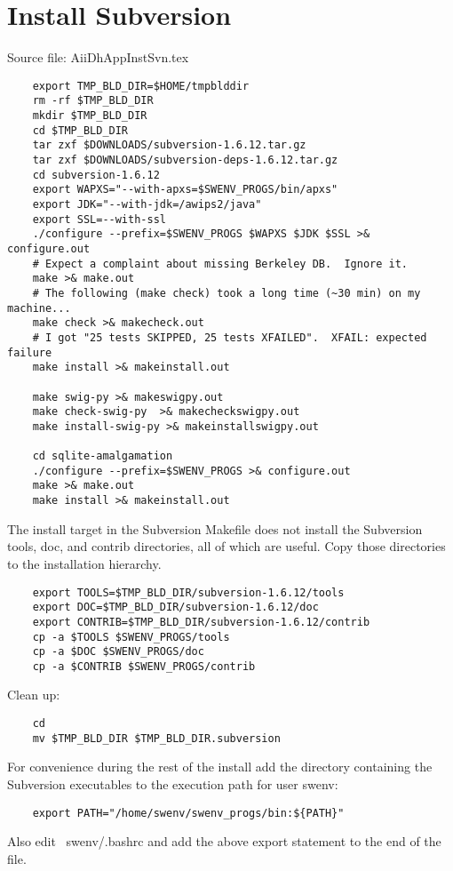 
\section{Install Subversion}

Source file: AiiDhAppInstSvn.tex

\begin{verbatim}
    export TMP_BLD_DIR=$HOME/tmpblddir
    rm -rf $TMP_BLD_DIR
    mkdir $TMP_BLD_DIR
    cd $TMP_BLD_DIR
    tar zxf $DOWNLOADS/subversion-1.6.12.tar.gz
    tar zxf $DOWNLOADS/subversion-deps-1.6.12.tar.gz
    cd subversion-1.6.12
    export WAPXS="--with-apxs=$SWENV_PROGS/bin/apxs"
    export JDK="--with-jdk=/awips2/java"
    export SSL=--with-ssl
    ./configure --prefix=$SWENV_PROGS $WAPXS $JDK $SSL >& configure.out
    # Expect a complaint about missing Berkeley DB.  Ignore it.
    make >& make.out
    # The following (make check) took a long time (~30 min) on my machine...
    make check >& makecheck.out
    # I got "25 tests SKIPPED, 25 tests XFAILED".  XFAIL: expected failure
    make install >& makeinstall.out

    make swig-py >& makeswigpy.out
    make check-swig-py  >& makecheckswigpy.out
    make install-swig-py >& makeinstallswigpy.out

    cd sqlite-amalgamation
    ./configure --prefix=$SWENV_PROGS >& configure.out
    make >& make.out
    make install >& makeinstall.out
\end{verbatim}

The install target in the Subversion Makefile does not install
the Subversion tools, doc, and contrib directories, all of which are 
useful.  Copy those directories to the installation hierarchy.

\begin{verbatim}   
    export TOOLS=$TMP_BLD_DIR/subversion-1.6.12/tools
    export DOC=$TMP_BLD_DIR/subversion-1.6.12/doc
    export CONTRIB=$TMP_BLD_DIR/subversion-1.6.12/contrib
    cp -a $TOOLS $SWENV_PROGS/tools
    cp -a $DOC $SWENV_PROGS/doc
    cp -a $CONTRIB $SWENV_PROGS/contrib
\end{verbatim}

Clean up:
\begin{verbatim}   
    cd
    mv $TMP_BLD_DIR $TMP_BLD_DIR.subversion
\end{verbatim}

For convenience during the rest of the install add the 
directory containing the Subversion executables to the 
execution path for user swenv:
\begin{verbatim}
    export PATH="/home/swenv/swenv_progs/bin:${PATH}"
\end{verbatim}
Also edit ~swenv/.bashrc and add the above export statement to 
the end of the file.


